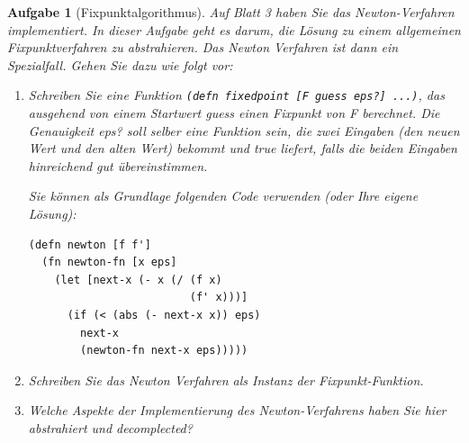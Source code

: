 \documentclass[11pt,a4paper]{article}
\newcounter{numb}
\theoremstyle{break}
\newtheorem{aufgabe}{Aufgabe}[numb]
\begin{document}
\begin{aufgabe}[Fixpunktalgorithmus]

Auf Blatt 3 haben Sie das Newton-Verfahren implementiert.
In dieser Aufgabe geht es darum, die L\"osung zu einem allgemeinen Fixpunktverfahren zu abstrahieren.
Das Newton Verfahren ist dann ein Spezialfall.
Gehen Sie dazu wie folgt vor:
    
\begin{enumerate}[label=\alph*)]
\item Schreiben Sie eine Funktion \texttt{(defn fixedpoint [F guess eps?] ...)}, das ausgehend von einem Startwert guess einen Fixpunkt von F berechnet.
    Die Genauigkeit eps? soll selber eine Funktion sein, die zwei Eingaben (den neuen Wert und den alten Wert) bekommt und true liefert, falls die beiden Eingaben hinreichend gut \"ubereinstimmen.

    Sie k\"onnen als Grundlage folgenden Code verwenden (oder Ihre eigene L\"osung):

\begin{verbatim}
(defn newton [f f']
  (fn newton-fn [x eps]
    (let [next-x (- x (/ (f x)
                         (f' x)))]
      (if (< (abs (- next-x x)) eps)
        next-x
        (newton-fn next-x eps)))))
\end{verbatim}

\item Schreiben Sie das Newton Verfahren als Instanz der Fixpunkt-Funktion.
\item Welche Aspekte der Implementierung des Newton-Verfahrens haben Sie hier abstrahiert und decomplected?
    \end{enumerate}
\end{aufgabe}
\end{document}
